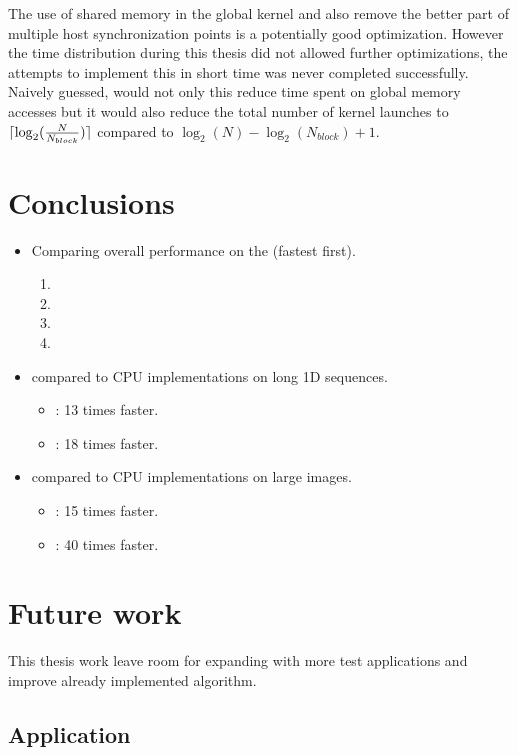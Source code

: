 The use of shared memory in the global \gls{kernel} and also remove the better part of multiple host synchronization points is a potentially good optimization. However the time distribution during this thesis did not allowed further optimizations, the attempts to implement this in short time was never completed successfully. Naively guessed, would not only this reduce time spent on global memory accesses but it would also reduce the total number of kernel launches to $\lceil\log_{2}(\frac{N}{N_{block}})\rceil$ compared to $\log_{2}(N) - \log_{2}(N_{block}) + 1$.

\section{Conclusions}

\begin{itemize}
	\item Comparing overall performance on the {\NVCARD} (fastest first).
	\begin{enumerate}	
		\item {\CU}
		\item {\DX}
		\item {\GL}
		\item {\OCL}
	\end{enumerate}
	\item {\CU} compared to CPU implementations on long 1D sequences.
	\begin{itemize}
		\item {\OMP}: 13 times faster.
		\item {\CPP}: 18 times faster.
	\end{itemize}
	\item {\CU} compared to CPU implementations on large images.
	\begin{itemize}
		\item {\OMP}: 15 times faster.
		\item {\CPP}: 40 times faster.
	\end{itemize}
\end{itemize}

\section{Future work}

This thesis work leave room for expanding with more test applications and improve already implemented algorithm.

\subsection{Application}

